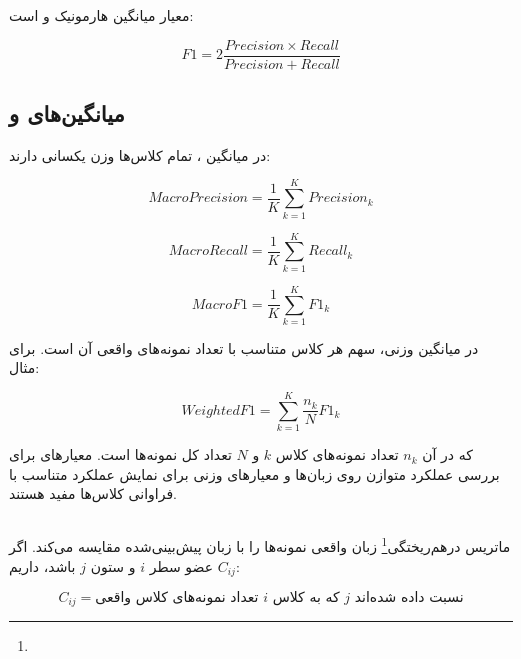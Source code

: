 معیار
میانگین هارمونیک
و
است:

\begin{equation}
F1
=
2
\frac{
Precision\times Recall
}{
Precision+Recall
}
\end{equation}


\subsection{میانگین‌های  و }

در میانگین
،
تمام کلاس‌ها وزن یکسانی دارند:

\begin{equation}
MacroPrecision
=
\frac{1}{K}
\sum_{k=1}^{K}Precision_k
\end{equation}

\begin{equation}
MacroRecall
=
\frac{1}{K}
\sum_{k=1}^{K}Recall_k
\end{equation}

\begin{equation}
MacroF1
=
\frac{1}{K}
\sum_{k=1}^{K}F1_k
\end{equation}

در میانگین وزنی، سهم هر کلاس متناسب با تعداد نمونه‌های واقعی آن است. برای مثال:

\begin{equation}
WeightedF1
=
\sum_{k=1}^{K}
\frac{n_k}{N}F1_k
\end{equation}

که در آن $n_k$ تعداد نمونه‌های کلاس $k$ و $N$ تعداد کل نمونه‌ها است. معیارهای
برای بررسی عملکرد متوازن روی زبان‌ها و معیارهای وزنی برای نمایش عملکرد متناسب با فراوانی کلاس‌ها مفید هستند.


\subsection{}

ماتریس درهم‌ریختگی\footnote{} زبان واقعی نمونه‌ها را با زبان پیش‌بینی‌شده مقایسه می‌کند. اگر $C_{ij}$ عضو سطر $i$ و ستون $j$ باشد، داریم:

\begin{equation}
C_{ij}
=
\text{تعداد نمونه‌های کلاس واقعی }i
\text{ که به کلاس }j
\text{ نسبت داده شده‌اند}
\end{equation}

